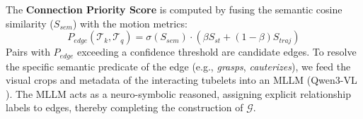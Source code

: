 The \textbf{Connection Priority Score} is computed by fusing the semantic cosine similarity ($S_{sem}$) with the motion metrics:
\begin{equation}
    P_{edge}(\mathcal{T}_k, \mathcal{T}_q) = \sigma(S_{sem}) \cdot \left( \beta S_{st} + (1-\beta) S_{traj} \right)
\end{equation}
Pairs with $P_{edge}$ exceeding a confidence threshold are candidate edges. To resolve the specific semantic predicate of the edge (e.g., \textit{grasps}, \textit{cauterizes}), we feed the visual crops and metadata of the interacting tubelets into an MLLM (Qwen3-VL \cite{qwen3vl}). The MLLM acts as a neuro-symbolic reasoned, assigning explicit relationship labels to edges, thereby completing the construction of $\mathcal{G}$.

